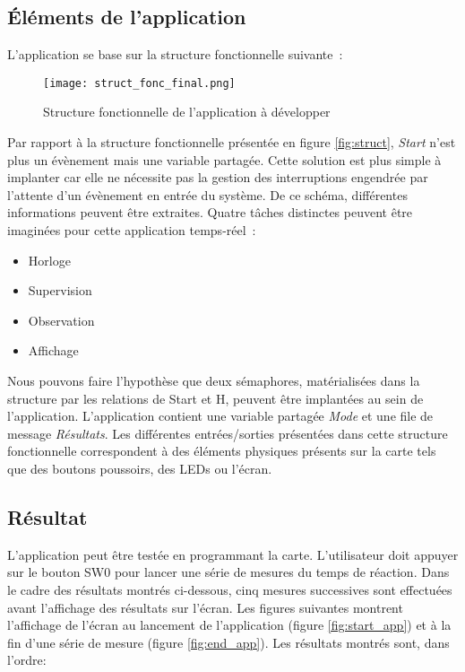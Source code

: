 \subsection{Éléments de l'application}

L'application se base sur la structure fonctionnelle suivante :

\begin{figure}[h]
    \centering
    \texttt{[image: struct\_fonc\_final.png]}
    \caption{Structure fonctionnelle de l'application à développer}
    \label{fig:struct_final}
\end{figure}

Par rapport à la structure fonctionnelle présentée en figure \ref{fig:struct}, \textit{Start} n'est plus un évènement mais une variable partagée.
Cette solution est plus simple à implanter car elle ne nécessite pas la gestion des interruptions engendrée par l'attente d'un évènement en entrée du système.
De ce schéma, différentes informations peuvent être extraites.
Quatre tâches distinctes peuvent être imaginées pour cette application temps-réel :

\begin{itemize}
    \item Horloge
    \item Supervision
    \item Observation    
    \item Affichage
\end{itemize}

Nous pouvons faire l'hypothèse que deux sémaphores, matérialisées dans la structure par les relations de Start et H, peuvent être implantées au sein de l'application.
L'application contient une variable partagée \textit{Mode} et une file de message \textit{Résultats}.
Les différentes entrées/sorties présentées dans cette structure fonctionnelle correspondent à des éléments physiques présents sur la carte tels que des boutons poussoirs, des LEDs ou l'écran.

\subsection{Résultat}

L'application peut être testée en programmant la carte.
L'utilisateur doit appuyer sur le bouton SW0 pour lancer une série de mesures du temps de réaction.
Dans le cadre des résultats montrés ci-dessous, cinq mesures successives sont effectuées avant l'affichage des résultats sur l'écran.
Les figures suivantes montrent l'affichage de l'écran au lancement de l'application (figure \ref{fig:start_app}) et à la fin d'une série de mesure (figure \ref{fig:end_app}).
Les résultats montrés sont, dans l'ordre:

